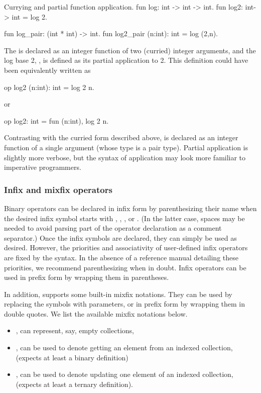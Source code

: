 \begin{easycrypt}[label={lst:currying}]{Currying and partial function application.}
fun log: int -> int -> int.
fun log2: int-> int = log 2.

fun log_pair: (int * int) -> int.
fun log2_pair (n:int): int = log (2,n).
\end{easycrypt}

The  is declared as an integer function of two (curried) integer
arguments, and the log base 2, , is defined as its partial
application to 2. This definition could have been equivalently written as
\begin{easycrypt}[frame=none]{}
op log2 (n:int): int = log 2 n.
\end{easycrypt}
or
\begin{easycrypt}[frame=none]{}
op log2: int = fun (n:int), log 2 n.
\end{easycrypt}
Contrasting with the curried form described above,  is declared
as an integer function of a single argument (whose type is a pair type).
Partial application is slightly more verbose, but the syntax of application may
look more familiar to imperative programmers.

\subsubsection*{Infix and mixfix operators}
Binary operators can be declared in infix form by parenthesizing their name when
the desired infix symbol starts with \ec{+}, \ec{:}, \ec{^},  or \ec{*}. (In the
latter case, spaces may be needed to avoid parsing part of the operator
declaration as a comment separator.) Once the infix symbols are declared, they
can simply be used as desired. However, the priorities and associativity of
user-defined infix operators are fixed by the syntax. In the absence of a
reference manual detailing these priorities, we recommend parenthesizing when
in doubt. Infix operators can be used in prefix form by wrapping them in
parentheses.

In addition, \EasyCrypt supports some built-in mixfix notations. They can be
used by replacing the \ec{_} symbols with parameters, or in prefix form by
wrapping them in double quotes. We list the available mixfix notations below.
\begin{itemize}\itemsep-.5em
\item \rawec{[]}, can represent, say, empty collections,
\item {}, can be used to denote getting an element from an indexed
  collection, (expects at least a binary definition)
\item {}, can be used to denote updating one element of an
  indexed collection, (expects at least a ternary definition).
\end{itemize}

